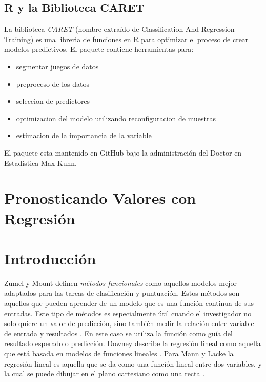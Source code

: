 \documentclass[letterpaper, spanish, 11pt]{report}
\begin{document}
\subsection{R y la Biblioteca CARET}
La biblioteca \emph{CARET} (nombre extraído de Classification And Regression Training) es una libreria de funciones en R para optimizar el proceso de crear modelos predictivos. El paquete contiene herramientas para:

\begin{itemize}
	\item segmentar juegos de datos
	\item preproceso de los datos
	\item seleccion de predictores
	\item optimizacion del modelo utilizando reconfiguracion de muestras
	\item estimacion de la importancia de la variable
\end{itemize}

El paquete esta mantenido en GitHub bajo la administración del Doctor en Estadística Max Kuhn.

\section{Pronosticando Valores con Regresión}

\section{Introducción}
Zumel y Mount definen \emph{métodos funcionales} como aquellos modelos mejor adaptados para las tareas de clasificación y puntuación. Estos métodos son aquellos que pueden aprender de un modelo que es una función continua de sus entradas. Este tipo de métodos es especialmente útil cuando el investigador no solo quiere un valor de predicción, sino también medir la relación entre variable de entrada y resultados \cite{zumelMount}. En este caso se utiliza la función como guía del resultado esperado o predicción. Downey describe la regresión lineal como aquella que está basada en modelos de funciones lineales \cite{thinkStats}. Para Mann y Lacke la regresión lineal es aquella que se da como una función lineal entre dos variables, y la cual se puede dibujar en el plano cartesiano como una recta \cite{intoStats7}.
\end{document}
